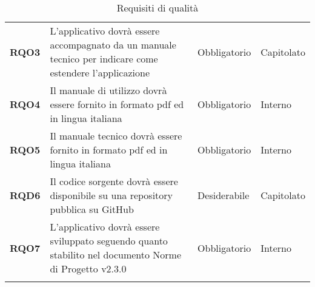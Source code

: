 \begin{longtable}[H]{| >{\raggedright\bfseries}m{20mm} | >{\raggedright}m{90mm} | >{\centering}m{25mm} | >{\centering\arraybackslash}m{30mm}|}
    RQO3
     & L'applicativo dovrà essere accompagnato da un manuale tecnico per indicare come estendere l'applicazione
     & Obbligatorio
     & Capitolato                                                                                                           \\

    RQO4
     & Il manuale di utilizzo dovrà essere fornito in formato pdf ed in lingua italiana
     & Obbligatorio
     & Interno                                                                                                              \\

    RQO5
     & Il manuale tecnico dovrà essere fornito in formato pdf ed in lingua italiana
     & Obbligatorio
     & Interno                                                                                                              \\

    RQD6
     & Il codice sorgente dovrà essere disponibile su una repository pubblica su GitHub
     & Desiderabile
     & Capitolato                                                                                                           \\

    RQO7
     & L'applicativo dovrà essere sviluppato seguendo quanto stabilito nel documento Norme di Progetto v2.3.0
     & Obbligatorio
     & Interno                                                                                                              \\
    \hline
    \rowcolor{white}
    \caption{Requisiti di qualità}%
    \label{tab:requisiti_di_qualita}
\end{longtable}
